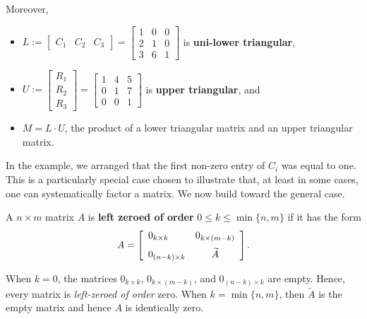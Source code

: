 \begin{example}
    Moreover, 
    \begin{itemize}
        \item  $L:=\left[\begin{array}{rrr} 
   C_1   &  C_2   &  C_3\end{array}  \right] = 
   \left[\begin{array}{rrr} 
       1  &   0  &   0 \\
    2  &  1   &  0 \\
     3  &  6   & 1 \end{array}  \right]$ is \textbf{uni-lower triangular}, 
     \item $U:=   \left[\begin{array}{r} 
    R_1 \\ R_2\\ R_3  \end{array}  \right] = \left[\begin{array}{rrr} 
     1  &   4   &  5 \\
     0  &   1   &  7 \\
     0  &   0   &  1 \end{array}  \right]$ is \textbf{upper triangular}, and \\
     \item $M=L \cdot U$, the product of a lower triangular matrix and an upper triangular matrix.
    \end{itemize}
    \Qed
\end{example} 

In the example, we arranged that the first non-zero entry of $C_i$ was equal to one. This is a particularly special case chosen to illustrate that, at least in some cases, one can systematically factor a matrix. We now build toward the general case. 

\begin{definition} A $n \times m$ matrix $A$ is \textbf{left zeroed of order} $0\le k \le \min\{n,m\}$ if it has the form 
$$ A= \left[\begin{array}{lc}
   0_{k \times k}  &  0_{k \times (m-k)}  \medskip \\
    0_{(n-k) \times  k} & \widetilde{A}
\end{array}  \right].$$
\end{definition}

\begin{rem} When $k=0$, the matrices $0_{k \times k}$, $0_{k \times (m-k)} $, and $0_{(n-k) \times  k}$ are empty. Hence, every matrix is \emph{left-zeroed of order} zero. When $k=\min\{n,m\}$, then $\widetilde{A}$ is the empty matrix and hence $A$ is identically zero.
\end{rem}

